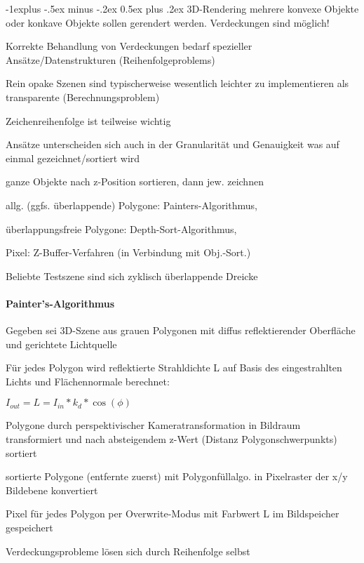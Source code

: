 \documentclass[landscape]{article}
\makeatletter
\renewcommand{\subsection}{\@startsection{subsection}{2}{0mm}%
                                {-1explus -.5ex minus -.2ex}%
                                {0.5ex plus .2ex}%
                                {\normalfont\normalsize\bfseries}}
\makeatother
\begin{document}
\begin{multicols}{3}
  
  \subsection{3D-Rendering}
  mehrere konvexe Objekte oder konkave Objekte sollen gerendert werden. Verdeckungen sind möglich!
  \begin{itemize*}
    \item Korrekte Behandlung von Verdeckungen bedarf spezieller Ansätze/Datenstrukturen (Reihenfolgeproblems)
    \item Rein opake Szenen sind typischerweise wesentlich leichter zu implementieren als transparente (Berechnungsproblem)
    \item Zeichenreihenfolge ist teilweise wichtig
    \item Ansätze unterscheiden sich auch in der Granularität und Genauigkeit was auf einmal gezeichnet/sortiert wird
    \item ganze Objekte nach z-Position sortieren, dann jew. zeichnen
    \item allg. (ggfs. überlappende) Polygone: Painters-Algorithmus,
    \item überlappungsfreie Polygone: Depth-Sort-Algorithmus,
    \item Pixel: Z-Buffer-Verfahren (in Verbindung mit Obj.-Sort.)
    \item Beliebte Testszene sind sich zyklisch überlappende Dreicke
  \end{itemize*}
  
  \paragraph{Painter’s-Algorithmus}
  \begin{itemize*}
    \item Gegeben sei 3D-Szene aus grauen Polygonen mit diffus reflektierender Oberfläche und gerichtete Lichtquelle
    \item Für jedes Polygon wird reflektierte Strahldichte L auf Basis des eingestrahlten Lichts und Flächennormale berechnet:
    \item $I_{out} = L = I_{in}* k_d * \cos(\phi)$
    \item Polygone durch perspektivischer Kameratransformation in Bildraum transformiert und nach absteigendem z-Wert (Distanz Polygonschwerpunkts) sortiert
    \item sortierte Polygone (entfernte zuerst) mit Polygonfüllalgo. in Pixelraster der x/y Bildebene konvertiert
    \item Pixel für jedes Polygon per Overwrite-Modus mit Farbwert L im Bildspeicher gespeichert
    \item Verdeckungsprobleme lösen sich durch Reihenfolge selbst
  \end{itemize*}
  

\end{multicols}
\end{document}
